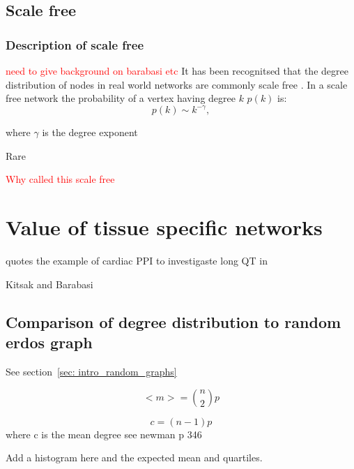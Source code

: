 \subsection{Scale free}
\label{sec:scale_free}
\subsubsection{Description of scale free}

\textcolor{red}{need to give background on barabasi etc}
It has been recognitsed that the degree distribution of nodes in real world networks are commonly scale free \cite{barabasi1999emergence} \cite{barabasi1999mean}. In a scale free network the probability of a vertex having degree $k$ $p(k)$ is:
\begin{equation}
    p(k) \sim k^{-\gamma},
\end{equation}
\label{eq:scale free}

where $\gamma$ is the degree exponent \cite{barabasi2016network}

Rare \cite{broido2019scale}

\textcolor{red}{Why called this scale free}




\section{Value of tissue specific networks}
\cite{parikshak2015systems} quotes the example of cardiac PPI to investigaste long QT in \cite{lundby2014annotation}

Kitsak and Barabasi \cite{kitsak2016tissue}

\subsection{Comparison of degree distribution to random erdos graph}
See section~\ref{sec: intro_random_graphs}

\begin{equation}
    <m> = \binom{n}{2}p
\end{equation}


\begin{equation}
    c = (n-1)p
\end{equation}
where c is the mean degree see newman p 346

Add a histogram here and the expected mean and quartiles.


